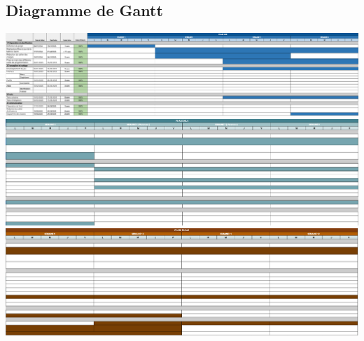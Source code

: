 \subsection{Diagramme de Gantt}
\includegraphics[width=15cm]{../Annexe/gantt1.png}\\
\includegraphics[width=15cm]{../Annexe/gantt2.png}\\
\includegraphics[width=15cm]{../Annexe/gantt3.png}